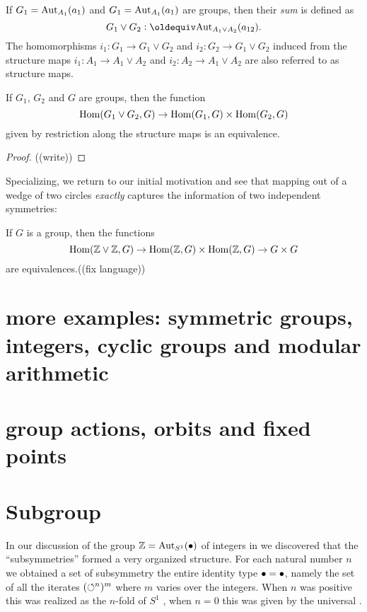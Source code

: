 \begin{definition}
  \label{def:sumofgroup}
  If $G_1=\mathrm{Aut}_{A_1}(a_1)$ and $G_1=\mathrm{Aut}_{A_1}(a_1)$ are groups, then their \emph{sum} is defined as
  $$G_1\vee G_2\defequi \aut_{A_1\vee A_2}(a_{12}).$$ The homomorphisms $i_1:G_1\to G_1\vee G_2$ and $i_2:G_2\to G_1\vee G_2$ induced from the structure maps  $i_1:A_1\to A_1\vee A_2$ and  $i_2:A_2\to A_1\vee A_2$ are also referred to as structure maps.
\end{definition}
\begin{lemma}
  \label{lem:sumofgroupsISsum} If $G_1$, $G_2$ and $G$ are groups, then the function
  $$\mathrm{Hom}(G_1\vee G_2,G)\to\mathrm{Hom}(G_1,G)\times\mathrm{Hom}(G_2,G)$$ 
given by restriction along the structure maps is an equivalence.
\end{lemma}
\begin{proof}
  ((write))
\end{proof}
Specializing, we return to our initial motivation and see that mapping out of a wedge of two circles \emph{exactly} captures the information of two independent symmetries:
\begin{corollary}
  \label{cor:ZplusZuniv}
  If $G$ is a group, then the functions
  $$\mathrm{Hom}(\mathbb{Z}\vee\mathbb{Z},G)\to \mathrm{Hom}(\mathbb{Z},G)\times\mathrm{Hom}(\mathbb{Z},G)\to G\times G$$
  are equivalences.((fix language))
\end{corollary}


\section{more examples: symmetric groups, integers, cyclic groups and modular arithmetic}
\section{group actions, orbits and fixed points}
\section{Subgroup}
\label{sec:subgroups}
In our discussion of the group $\mathbb{Z}=\mathrm{Aut}_{S^1}(\bullet)$ of integers in we discovered that the ``subsymmetries'' formed a very organized structure.  For each natural number $n$ we obtained a set of subsymmetry the entire identity type $\bullet=\bullet$, namely the set of all the iterates $(\circlearrowleft^{n})^m$ where $m$ varies over the integers.  When $n$ was positive this was realized as the $n$-fold \covering of $S^1$ , when $n=0$ this was given by the universal \covering.  

